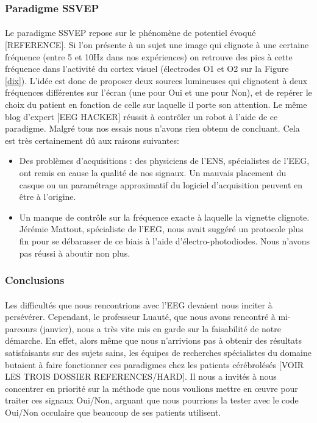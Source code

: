 \documentclass[11pt,a4paper]{article}
\theoremstyle{plain}
\theoremstyle{definition}
\begin{document}
\subsubsection{Paradigme SSVEP}

\paragraph{} Le paradigme SSVEP repose sur le phénomène de potentiel évoqué [REFERENCE]. Si l'on présente à un sujet une image qui clignote à une certaine fréquence (entre 5 et 10Hz dans nos expériences) on retrouve 
des pics à cette fréquence dans l'activité du cortex visuel (électrodes O1 et O2 sur la Figure \ref{dix}). L'idée est donc de proposer deux sources lumineuses qui clignotent à deux fréquences différentes sur l'écran (une pour Oui et une pour Non), et de repérer le choix du patient en fonction de celle sur laquelle il porte son attention. Le même blog d'expert [EEG HACKER] réussit à contrôler un robot à l'aide de ce paradigme.
Malgré tous nos essais nous n'avons rien obtenu de concluant. Cela est très certainement dû aux raisons suivantes:

\begin{itemize}
\item Des problèmes d'acquisitions : des physiciens de l'ENS, spécialistes de l'EEG, ont remis en cause la qualité de nos signaux. Un mauvais placement du casque ou un paramétrage approximatif du logiciel d'acquisition peuvent en être à l'origine.
\item Un manque de contrôle sur la fréquence exacte à laquelle la vignette clignote. Jérémie Mattout, spécialiste de l'EEG, nous avait suggéré un protocole
plus fin pour se débarasser de ce biais à l'aide d'électro-photodiodes. Nous n'avons pas réussi à aboutir non plus.
\end{itemize}

\subsubsection{Conclusions}

\paragraph{} Les difficultés que nous rencontrions avec l'EEG devaient nous inciter à persévérer. Cependant, le professeur Luauté, que nous avons rencontré à mi-parcours (janvier), nous a très vite mis en garde sur la faisabilité de notre démarche. En effet, alors même que nous n'arrivions pas à obtenir des résultats satisfaisants sur des sujets sains, les équipes de recherches spécialistes du domaine butaient à faire fonctionner ces paradigmes chez les patients cérébrolésés [VOIR LES TROIS DOSSIER REFERENCES/HARD]. Il nous a invités à nous concentrer en priorité sur la méthode que nous voulions mettre en \oe uvre pour traiter ces signaux Oui/Non, arguant que nous pourrions la tester avec le code Oui/Non occulaire que beaucoup de ses patients utilisent. 
\end{document}
